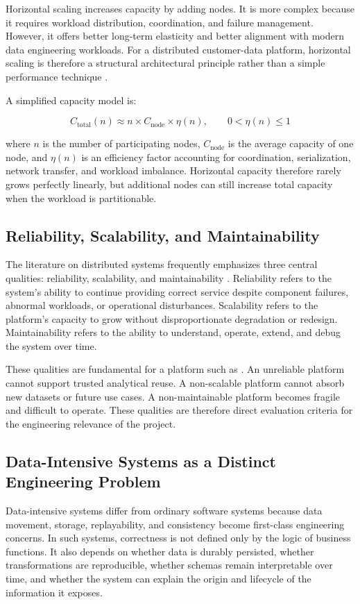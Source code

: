 Horizontal scaling increases capacity by adding nodes. It is more complex because it requires workload distribution, coordination, and failure management. However, it offers better long-term elasticity and better alignment with modern data engineering workloads. For a distributed customer-data platform, horizontal scaling is therefore a structural architectural principle rather than a simple performance technique \cite{kleppmann2017ddia}.

A simplified capacity model is:

\[
C_{\text{total}}(n) \approx n \times C_{\text{node}} \times \eta(n),
\qquad 0 < \eta(n) \leq 1
\]

where $n$ is the number of participating nodes, $C_{\text{node}}$ is the average capacity of one node, and $\eta(n)$ is an efficiency factor accounting for coordination, serialization, network transfer, and workload imbalance. Horizontal capacity therefore rarely grows perfectly linearly, but additional nodes can still increase total capacity when the workload is partitionable.

\subsection{Reliability, Scalability, and Maintainability}
The literature on distributed systems frequently emphasizes three central qualities: reliability, scalability, and maintainability \cite{kleppmann2017ddia}. Reliability refers to the system's ability to continue providing correct service despite component failures, abnormal workloads, or operational disturbances. Scalability refers to the platform's capacity to grow without disproportionate degradation or redesign. Maintainability refers to the ability to understand, operate, extend, and debug the system over time.

These qualities are fundamental for a platform such as \projectname. An unreliable platform cannot support trusted analytical reuse. A non-scalable platform cannot absorb new datasets or future use cases. A non-maintainable platform becomes fragile and difficult to operate. These qualities are therefore direct evaluation criteria for the engineering relevance of the project.

\subsection{Data-Intensive Systems as a Distinct Engineering Problem}
Data-intensive systems differ from ordinary software systems because data movement, storage, replayability, and consistency become first-class engineering concerns. In such systems, correctness is not defined only by the logic of business functions. It also depends on whether data is durably persisted, whether transformations are reproducible, whether schemas remain interpretable over time, and whether the system can explain the origin and lifecycle of the information it exposes.

